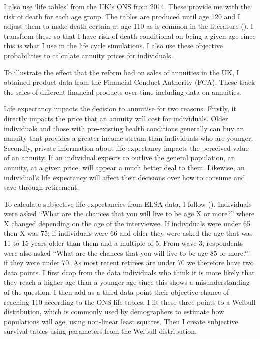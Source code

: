 \documentclass[12pt]{article}
\begin{document}
I also use `life tables' from the UK's ONS from 2014. These provide me with the
risk of death for each age group. The tables are produced until age 120 and I
adjust them to make death certain at age 110 as is common in the literature
(\cite{odea-sturrock-rest-2023}). I transform these so that I have risk of death
conditional on being a given age since this is what I use in the life cycle
simulations. I also use these objective probabilities to calculate annuity
prices for individuals.

To illustrate the effect that the reform had on sales of annuities in the UK, I
obtained product data from the Financial Conduct Authority (FCA). These track the
sales of different financial products over time including data on annuities.

Life expectancy impacts the decision to annuitise for two reasons. Firstly, it
directly impacts the price that an annuity will cost for individuals. Older
individuals and those with pre-existing health conditions generally can buy an
annuity that provides a greater income stream than individuals who are younger.
Secondly, private information about life expectancy impacts the perceived value
of an annuity. If an individual expects to outlive the general population, an
annuity, at a given price, will appear a much better deal to them. Likewise, an
individual's life expectancy will affect their decisions over how to consume and
save through retirement.

To calculate subjective life expectancies from ELSA data, I follow
(\cite{odea-sturrock-rest-2023}). Individuals were asked “What are the chances
that you will live to be age X or more?” where X changed depending on the age of
the interviewee. If individuals were under 65 then X was 75; if individuals were
66 and older they were asked the age that was 11 to 15 years older than them and
a multiple of 5. From wave 3, respondents were also asked “What are the chances
that you will live to be age 85 or more?” if they were under 70. As most recent
retirees are under 70 we therefore have two data points. I first drop from the
data individuals who think it is more likely that they reach a higher age than a
younger age since this shows a misunderstanding of the question. I then add as a
third data point their objective chance of reaching 110 according to the ONS
life tables. I fit these three points to a Weibull distribution, which is
commonly used by demographers to estimate how populations will age, using
non-linear least squares. Then I create subjective survival tables using
parameters from the Weibull distribution.
\end{document}
